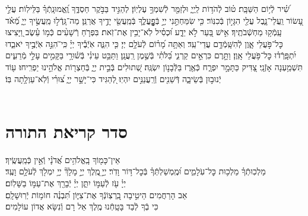 \documentclass[twoside, openany, parskip=half, 11pt]{book}
\begin{document}

שִׁ֝֗יר לְֿי֥וֹם הַשַּׁבָּֽת׃
ט֗וֹב לְֿהֹד֥וֹת לַֽיְיָ֑ וּלְזַמֵּ֖ר לְֿשִׁמְךָ֣ עֶלְיֽוֹן׃
לְהַגִּ֣יד בַּבֹּ֣קֶר חַסְדֶּ֑ךָ וֶֽ֝אֱמוּנָֽתְֿךָ֗ בַּלֵּילֽוֹת׃
עֲלֵ֣י עָ֭שׂוֹר וַֽעֲלֵי־נָ֑בֶל עֲלֵ֖י הִגָּי֣וֹן בְּֿכִנּֽוֹר׃
כִּ֤י שִׂמַּחְתַּ֣נִי יְיָ֣ בְּֿפׇׇׇׇׇׇׇׇׇׇׇׇׇׇָֽעֳלֶ֑ךָ בְּֿמַֽעֲשֵׂ֖י יָדֶ֣יךָ אֲרַנֵּֽן׃
מַה־גָּֽדְֿל֣וּ מַֽעֲשֶׂ֣יךָ יְיָ֑ מְֿ֝אֹ֗ד עָֽמְֿק֥וּ מַחְשְֿׁבֹתֶֽיךָ׃
אִ֣ישׁ בַּ֭עַר לֹ֣א יֵדָ֑ע וּ֝כְסִ֗יל לֹֽא־יָבִ֥ין אֶת־זֹֽאת׃
בִּפְרֹ֤חַ רְֿשָׁעִ֨ים כְּֿמ֥וֹ עֵ֗שֶׂב וַ֭יָּצִיצוּ כׇּל־פֹּ֣עֲלֵי אָ֑וֶן לְֿהִשָּֽׁמְֿדָ֥ם עֲדֵי־עַֽד׃
וְאַתָּ֥ה מָ֝ר֗וֹם לְֿעֹלָ֥ם יְיָ׃
כִּ֤י הִנֵּ֢ה אֹֽיְֿבֶ֡יךָ יְיָ֗ כִּֽי־ֹהִנֵּ֣ה אֹֽיְֿבֶ֣יךָ יֹאבֵ֑דוּ יִ֝תְפָּֽרְֿד֗וּ כׇּל־פֹּ֥עֲלֵי אָֽוֶן׃
וַתָּ֣רֶם כִּרְאֵ֣ים קַרְנִ֑י בַּ֝לֹּתִ֗י בְּֿשֶׁ֣מֶן רַֽעֲנָֽן׃
וַתַּבֵּ֥ט עֵינִ֗י בְּֿשׁ֫וּרָ֥י בַּקָּמִ֣ים עָלַ֣י מְֿרֵעִ֑ים תִּשְׁמַ֥עְנָה אָזְֿנָֽי׃
צַ֭דִּיק כַּתָּמָ֣ר יִפְרָ֑ח כְּֿאֶ֖רֶז בַּלְּֿבָנ֣וֹן יִשְׂגֶּֽה׃
שְׁ֭תוּלִים בְּֿבֵ֣ית יְיָ֑ בְּֿחַצְר֖וֹת אֱלֹהֵ֣ינוּ יַפְרִֽיחוּ׃
ע֖וֹד יְֿנוּב֣וּן בְּֿשֵׂיבָ֑ה דְּֿשֵׁנִ֖ים וְֿרַֽעֲנַנִּ֣ים יִהְיֽוּ׃
לְ֭הַגִּיד כִּי־יָשָׁ֣ר יְיָ֑ צ֝וּרִ֗י וְֿלֹֽא־עַוְלָ֥תָה בּֽוֹ׃\\
\RChBarekhi
\ledavid\\
\mournerskaddish

\nextpage

\chapter[סדר קריאת התורה]{ סדר קריאת התורה }

 אֵין־כָּמ֖וֹךָ בָֽאֱלֹהִ֥ים אֲ֝דֹנָ֗י וְֿאֵ֣ין כְּֿמַֽעֲשֶֽׂיךָ׃
 \\
מַלְכֽוּתְֿךָ֗ מַלְכ֥וּת כׇּל־עֹֽלָמִ֑ים וּ֝מֶֽמְשַׁלְתְּֿךָ֗ בְּֿכׇל־דּ֥וֹר וָדֹֽר׃
יְיָ֣ ֖מֶֽלֶךְ
 יְיָ֣ מָלָךְ֘
 יְיָ֥ יִמְלֹ֖ךְ לְֿעֹלָ֥ם וָעֶֽד׃
 \\
יְיָ֗ עֹ֖ז לְֿעַמּ֣וֹ יִתֵּ֑ן יְיָ֓ יְֿבָרֵ֖ךְ אֶת־עַמּ֣וֹ בַשָּׁלֽוֹם׃
\\
אַב הָרַחֲמִים הֵיטִ֣יבָה בִֽ֭רְצֽוֹנְֿךָ אֶת־צִיּ֑וֹן תִּ֝בְנֶ֗ה חוֹמ֥וֹת יְֿרֽוּשָׁלָֽםִ׃
 \\
כִּי בְֿךָ לְֿבַד בָּטָֽחְֿנוּ מֶֽלֶךְ אֵל רָם וְֿנִשָּׂא אֲדוֹן עוֹלָמִים׃





\pesicha
\end{document}
